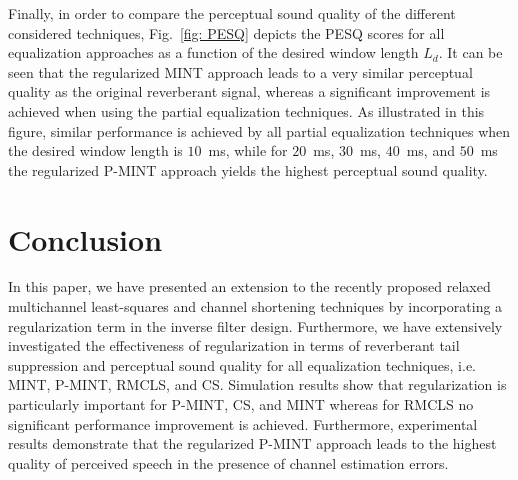 \documentclass{article}
\begin{document}
Finally, in order to compare the perceptual sound quality of the different considered techniques, Fig.~\ref{fig: PESQ} depicts the PESQ scores for all equalization approaches as a function of the desired window length $L_d$.
It can be seen that the regularized MINT approach leads to a very similar perceptual quality as the original reverberant signal, whereas a significant improvement is achieved when using the partial equalization techniques.
As illustrated in this figure, similar performance is achieved by all partial equalization techniques when the desired window length is $10$~ms, while for $20$~ms, $30$~ms, $40$~ms, and $50$~ms the regularized P-MINT approach yields the highest perceptual sound quality.

\vspace{-0.1cm}
\section{Conclusion}
\vspace{-0.2cm}

In this paper, we have presented an extension to the recently proposed relaxed multichannel least-squares and channel shortening techniques by incorporating a regularization term in the inverse filter design.
Furthermore, we have extensively investigated the effectiveness of regularization in terms of reverberant tail suppression and perceptual sound quality for all equalization techniques, i.e. MINT, P-MINT, RMCLS, and CS.
Simulation results show that regularization is particularly important for P-MINT, CS, and MINT whereas for RMCLS no significant performance improvement is achieved. 
Furthermore, experimental results demonstrate that the regularized P-MINT approach leads to the highest quality of perceived speech in the presence of channel estimation errors.



\end{document}
